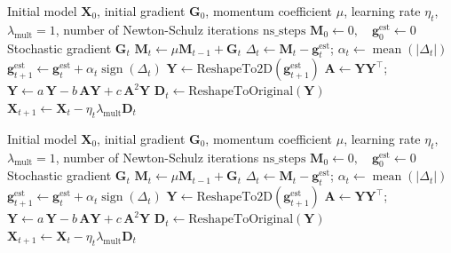 \documentclass{article}
\begin{document}
\begin{algorithm}[H]
\caption{EF-USignMuon}
\begin{algorithmic}[1]
\Require Initial model $\mathbf{X}_0$, initial gradient $\mathbf{G}_0$, momentum coefficient $\mu$, learning rate $\eta_t$, $\lambda_{\mathrm{mult}}=1$, number of Newton-Schulz iterations $\mathrm{ns\_steps}$
\State $\mathbf{M}_0 \gets 0,\quad \mathbf{g}_0^{\mathrm{est}} \gets 0$
  \State Stochastic gradient $\mathbf{G}_t$
  \State $\mathbf{M}_t \gets \mu\mathbf{M}_{t-1} + \mathbf{G}_t$
  \State $\Delta_t \gets \mathbf{M}_t - \mathbf{g}_t^{\mathrm{est}}$;
  \State $\alpha_t \gets \operatorname{mean}(|\Delta_t|)$
  \State $\mathbf{g}_{t+1}^{\mathrm{est}} \gets \mathbf{g}_t^{\mathrm{est}} + \alpha_t\operatorname{sign}(\Delta_t)$
  \State $\mathbf{Y} \gets \text{ReshapeTo2D}(\mathbf{g}_{t+1}^{\mathrm{est}})$
   
      \State $\mathbf{A} \gets \mathbf{Y}\mathbf{Y}^\top$;
      \State $\mathbf{Y} \gets a\,\mathbf{Y} - b\,\mathbf{A}\mathbf{Y} + c\,\mathbf{A}^2\mathbf{Y}$
  \EndFor
  \State $\mathbf{D}_t \gets \text{ReshapeToOriginal}(\mathbf{Y})$
  \State $\mathbf{X}_{t+1} \gets \mathbf{X}_t - \eta_t\lambda_{\mathrm{mult}}\mathbf{D}_t$
\EndFor
\label{central_alg_ef}
\end{algorithmic}
\end{algorithm}

\begin{algorithm}[H]
\caption{EF-UDSignMuon}
\begin{algorithmic}[1]
\Require Initial model $\mathbf{X}_0$, initial gradient $\mathbf{G}_0$, momentum coefficient $\mu$, learning rate $\eta_t$, $\lambda_{\mathrm{mult}}=1$, number of Newton-Schulz iterations $\mathrm{ns\_steps}$
\State $\mathbf{M}_0 \gets 0,\quad \mathbf{g}_0^{\mathrm{est}} \gets 0$
  \State Stochastic gradient $\mathbf{G}_t$
  \State $\mathbf{M}_t \gets \mu\mathbf{M}_{t-1} + \mathbf{G}_t$
  \State $\Delta_t \gets \mathbf{M}_t - \mathbf{g}_t^{\mathrm{est}}$;
  \State $\alpha_t \gets \operatorname{mean}(|\Delta_t|)$
  \State $\mathbf{g}_{t+1}^{\mathrm{est}} \gets \mathbf{g}_t^{\mathrm{est}} + \alpha_t\operatorname{sign}(\Delta_t)$
  \State $\mathbf{Y} \gets \text{ReshapeTo2D}(\mathbf{g}_{t+1}^{\mathrm{est}})$
   
      \State $\mathbf{A} \gets \mathbf{Y}\mathbf{Y}^\top$;
      \State $\mathbf{Y} \gets a\,\mathbf{Y} - b\,\mathbf{A}\mathbf{Y} + c\,\mathbf{A}^2\mathbf{Y}$
  \EndFor
  \State $\mathbf{D}_t \gets \text{ReshapeToOriginal}(\mathbf{Y})$
  \State $\mathbf{X}_{t+1} \gets \mathbf{X}_t - \eta_t\lambda_{\mathrm{mult}}\mathbf{D}_t$
\EndFor
\label{central_alg_ef}
\end{algorithmic}
\end{algorithm}
\end{document}
